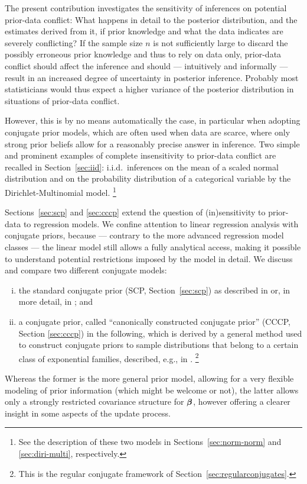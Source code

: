 The present contribution investigates the sensitivity of inferences on potential prior-data conflict:
What happens in detail to the posterior distribution, and the estimates derived from it, if prior knowledge and
what the data indicates are severely conflicting?
If the sample size $n$ is not sufficiently large to discard the
possibly erroneous prior knowledge and thus to rely on data only,
prior-data conflict should affect the inference and
should  --- intuitively and informally ---  result in an increased degree
of uncertainty in posterior inference. Probably most statisticians would thus expect
a higher variance of the posterior distribution in situations of prior-data conflict.

However, this is by no means automatically the case,
in particular when adopting conjugate prior models,
which are often used when data are
scarce, where only strong prior beliefs allow for a reasonably
precise answer in inference. Two simple and prominent examples
of complete insensitivity to prior-data conflict are recalled in
Section~\ref{sec:iid}: i.i.d.\ inferences on the mean of a scaled normal distribution
and on the probability distribution of a categorical variable by the Dirichlet-Multinomial model.%
\footnote{See the description of these two models in Sections~\ref{sec:norm-norm} and \ref{sec:diri-multi}, respectively.}

Sections~\ref{sec:scp} and \ref{sec:cccp} extend
the question of (in)sensitivity to prior-data to regression models.
We confine attention to linear regression analysis with conjugate priors,
because --- contrary to the more advanced regression model classes ---
the linear model still allows a fully analytical access, making it possible to understand
potential restrictions imposed by the model in detail.
We discuss and compare two different conjugate models:
\begin{enumerate}[(i)]
\item the standard conjugate prior (SCP, Section~\ref{sec:scp}) as described in \textcite{2013:fahrmeier-kneib-lang-marx} or,
in more detail, in \textcite{1994:ohagan}; and
\item a conjugate prior, called ``canonically constructed conjugate prior'' (CCCP, Section \ref{sec:cccp}) in the following,
which is derived by a general method used to construct conjugate priors to sample distributions that
belong to a certain class of exponential families, described, e.g., in \textcite{2000:bernardosmith}.%
\footnote{This is the regular conjugate framework of Section~\ref{sec:regularconjugates}.}
\end{enumerate}
Whereas the former is the more general prior model, allowing for
a very flexible modeling of prior information (which might be welcome or not),
the latter allows only a strongly restricted covariance structure for $\boldsymbol{\beta}$,
however offering a clearer insight in some aspects of the update process.

